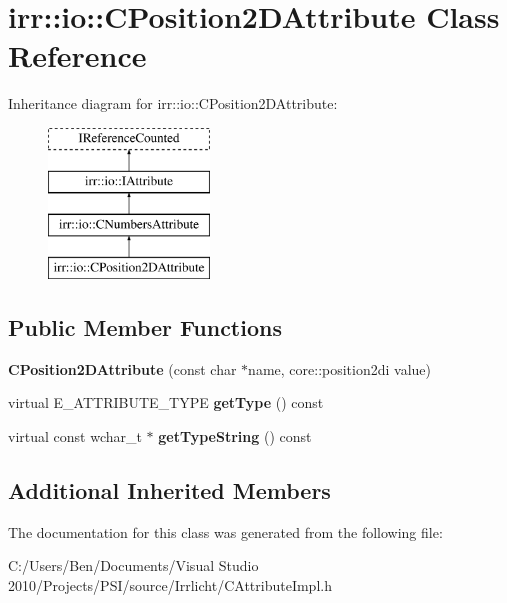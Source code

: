\hypertarget{classirr_1_1io_1_1_c_position2_d_attribute}{\section{irr\-:\-:io\-:\-:C\-Position2\-D\-Attribute Class Reference}
\label{classirr_1_1io_1_1_c_position2_d_attribute}
}
Inheritance diagram for irr\-:\-:io\-:\-:C\-Position2\-D\-Attribute\-:\begin{figure}[H]
\begin{center}
\leavevmode
\includegraphics[height=4.000000cm]{classirr_1_1io_1_1_c_position2_d_attribute}
\end{center}
\end{figure}
\subsection*{Public Member Functions}
\begin{DoxyCompactItemize}
\item 
\hypertarget{classirr_1_1io_1_1_c_position2_d_attribute_acf1aeb32aab9b8804582239e6f904575}{{\bfseries C\-Position2\-D\-Attribute} (const char $\ast$name, core\-::position2di value)}\label{classirr_1_1io_1_1_c_position2_d_attribute_acf1aeb32aab9b8804582239e6f904575}

\item 
\hypertarget{classirr_1_1io_1_1_c_position2_d_attribute_a63fc6d47003c85b708d454b18e3e079d}{virtual E\-\_\-\-A\-T\-T\-R\-I\-B\-U\-T\-E\-\_\-\-T\-Y\-P\-E {\bfseries get\-Type} () const }\label{classirr_1_1io_1_1_c_position2_d_attribute_a63fc6d47003c85b708d454b18e3e079d}

\item 
\hypertarget{classirr_1_1io_1_1_c_position2_d_attribute_a647fef9141080f63b11135666e2a4d45}{virtual const wchar\-\_\-t $\ast$ {\bfseries get\-Type\-String} () const }\label{classirr_1_1io_1_1_c_position2_d_attribute_a647fef9141080f63b11135666e2a4d45}

\end{DoxyCompactItemize}
\subsection*{Additional Inherited Members}


The documentation for this class was generated from the following file\-:\begin{DoxyCompactItemize}
\item 
C\-:/\-Users/\-Ben/\-Documents/\-Visual Studio 2010/\-Projects/\-P\-S\-I/source/\-Irrlicht/C\-Attribute\-Impl.\-h\end{DoxyCompactItemize}

